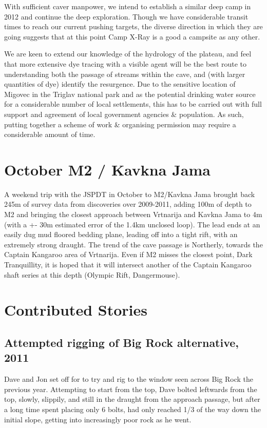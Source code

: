 With sufficient caver manpower, we intend to establish a similar deep
camp in 2012 and continue the deep exploration. Though we have
considerable transit times to reach our current pushing targets, the
diverse direction in which they are going suggests that at this point
Camp X-Ray is a good a campsite as any other.

We are keen to extend our knowledge of the hydrology of the plateau, and
feel that more extensive dye tracing with a visible agent will be the
best route to understanding both the passage of streams within the cave,
and (with larger quantities of dye) identify the resurgence. Due to the
sensitive location of Migovec in the Triglav national park and as the
potential drinking water source for a considerable number of local
settlements, this has to be carried out with full support and agreement
of local government agencies \& population. As such, putting together a
scheme of work \& organising permission may require a considerable
amount of time.

\section{October M2 / Kavkna Jama}

A weekend trip with the JSPDT in October to M2/Kavkna Jama brought back
245m of survey data from discoveries over 2009-2011, adding 100m of
depth to M2 and bringing the closest approach between Vrtnarija and
Kavkna Jama to 4m (with a +- 30m estimated error of the 1.4km unclosed
loop). The lead ends at an easily dug mud floored bedding plane, leading
off into a tight rift, with an extremely strong draught. The trend of
the cave passage is Northerly, towards the Captain Kangaroo area of
Vrtnarija. Even if M2 misses the closest point, Dark Tranquillity, it is
hoped that it will intersect another of the Captain Kangaroo shaft
series at this depth (Olympic Rift, Dangermouse).

\section{Contributed Stories}

\subsection{Attempted rigging of Big Rock alternative, 2011}

Dave and Jon set off for to try and rig to the window seen across Big
Rock the previous year. Attempting to start from the top, Dave bolted
leftwards from the top, slowly, slippily, and still in the draught from
the approach passage, but after a long time spent placing only 6 bolts,
had only reached 1/3 of the way down the initial slope, getting into
increasingly poor rock as he went.

